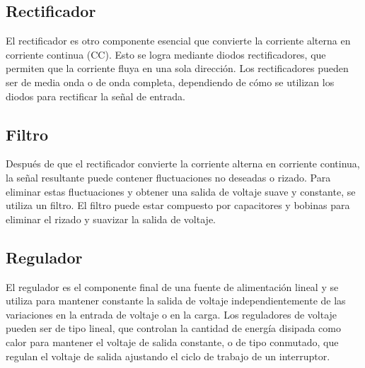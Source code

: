 \subsection{Rectificador}\par 
El rectificador es otro componente esencial que convierte la corriente alterna en corriente continua (CC). Esto se logra mediante diodos rectificadores, que permiten que la corriente fluya en una sola dirección. Los rectificadores pueden ser de media onda o de onda completa, dependiendo de cómo se utilizan los diodos para rectificar la señal de entrada.

\subsection{Filtro}\par 
Después de que el rectificador convierte la corriente alterna en corriente continua, la señal resultante puede contener fluctuaciones no deseadas o rizado. Para eliminar estas fluctuaciones y obtener una salida de voltaje suave y constante, se utiliza un filtro. El filtro puede estar compuesto por capacitores y bobinas para eliminar el rizado y suavizar la salida de voltaje.

\subsection{Regulador}\par 
El regulador es el componente final de una fuente de alimentación lineal y se utiliza para mantener constante la salida de voltaje independientemente de las variaciones en la entrada de voltaje o en la carga. Los reguladores de voltaje pueden ser de tipo lineal, que controlan la cantidad de energía disipada como calor para mantener el voltaje de salida constante, o de tipo conmutado, que regulan el voltaje de salida ajustando el ciclo de trabajo de un interruptor.

